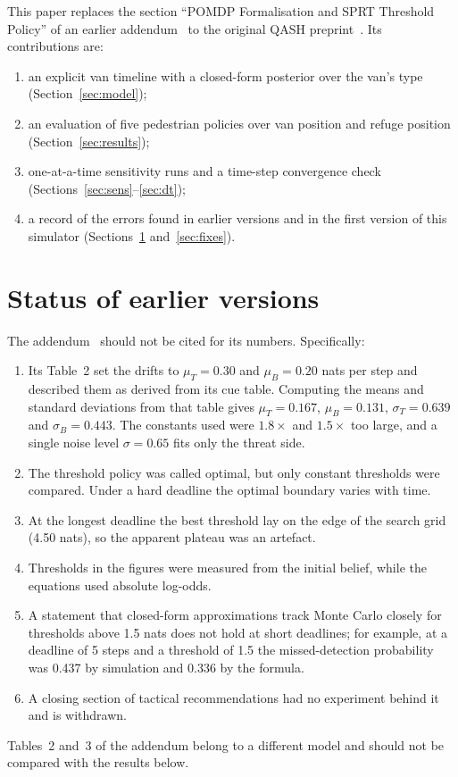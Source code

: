 \documentclass[11pt,a4paper]{article}
\begin{document}
This paper replaces the section ``POMDP Formalisation and SPRT Threshold Policy'' of an earlier addendum~\cite{qashadd} to the original QASH preprint~\cite{qash}. Its contributions are:
\begin{enumerate}
  \item an explicit van timeline with a closed-form posterior over the van's type (Section~\ref{sec:model});
  \item an evaluation of five pedestrian policies over van position and refuge position (Section~\ref{sec:results});
  \item one-at-a-time sensitivity runs and a time-step convergence check (Sections~\ref{sec:sens}--\ref{sec:dt});
  \item a record of the errors found in earlier versions and in the first version of this simulator (Sections~\ref{sec:status} and~\ref{sec:fixes}).
\end{enumerate}

\section{Status of earlier versions}\label{sec:status}
The addendum~\cite{qashadd} should not be cited for its numbers. Specifically:
\begin{enumerate}
  \item Its Table~2 set the drifts to $\mu_T=0.30$ and $\mu_B=0.20$ nats per step and described them as derived from its cue table. Computing the means and standard deviations from that table gives $\mu_T=0.167$, $\mu_B=0.131$, $\sigma_T=0.639$ and $\sigma_B=0.443$. The constants used were $1.8\times$ and $1.5\times$ too large, and a single noise level $\sigma=0.65$ fits only the threat side.
  \item The threshold policy was called optimal, but only constant thresholds were compared. Under a hard deadline the optimal boundary varies with time.
  \item At the longest deadline the best threshold lay on the edge of the search grid (4.50 nats), so the apparent plateau was an artefact.
  \item Thresholds in the figures were measured from the initial belief, while the equations used absolute log-odds.
  \item A statement that closed-form approximations track Monte Carlo closely for thresholds above 1.5 nats does not hold at short deadlines; for example, at a deadline of 5 steps and a threshold of 1.5 the missed-detection probability was 0.437 by simulation and 0.336 by the formula.
  \item A closing section of tactical recommendations had no experiment behind it and is withdrawn.
\end{enumerate}
Tables~2 and~3 of the addendum belong to a different model and should not be compared with the results below.
\end{document}
